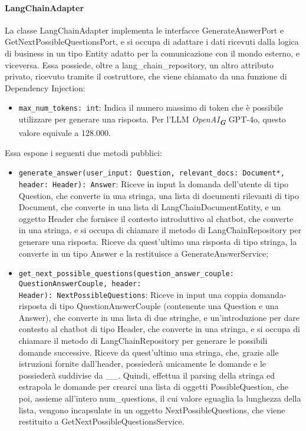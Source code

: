 \paragraph{LangChainAdapter}
\label{sec:langchain_adapter}
La classe LangChainAdapter implementa le interfacce GenerateAnswerPort e GetNextPossibleQuestionsPort, e si occupa di adattare i dati ricevuti dalla logica di business in un tipo Entity adatto per la comunicazione con il mondo esterno, e viceversa. 
Essa possiede, oltre a lang\_chain\_repository, un altro attributo privato, ricevuto tramite il costruttore, che viene chiamato da una funzione di Dependency Injection:
\begin{itemize}
    \item \texttt{max\_num\_tokens: int}: Indica il numero massimo di token che è possibile utilizzare per generare una risposta. Per l'LLM \emph{OpenAI}\textsubscript{\textbf{\textit{G}}} GPT-4o, questo valore equivale a 128.000.
\end{itemize}
Essa espone i seguenti due metodi pubblici:
\begin{itemize}
    \item \texttt{generate\_answer(user\_input: Question, relevant\_docs: Document*, header: Header): Answer}: Riceve in input la domanda dell'utente di tipo Question, che converte in una stringa, una lista di documenti rilevanti di tipo Document, che converte in una lista di LangChainDocumentEntity, e un oggetto Header che fornisce il contesto introduttivo al chatbot, che converte in una stringa, e si occupa di chiamare il metodo di LangChainRepository per generare una risposta. Riceve da quest'ultimo una risposta di tipo stringa, la converte in un tipo Answer e la restituisce a GenerateAnswerService;
    \item \texttt{get\_next\_possible\_questions(question\_answer\_couple: QuestionAnswerCouple, header:\\ Header): NextPossibleQuestions}: Riceve in input una coppia domanda-risposta di tipo QuestionAnswerCouple (contenente una Question e una Answer), che converte in una lista di due stringhe, e un'introduzione per dare contesto al chatbot di tipo Header, che converte in una stringa, e si occupa di chiamare il metodo di LangChainRepository per generare le possibili domande successive. Riceve da quest'ultimo una stringa, che, grazie alle istruzioni fornite dall'header, possiederà unicamente le domande e le possiederà suddivise da \_\_. Quindi, effettua il parsing della stringa ed estrapola le domande per crearci una lista di oggetti PossibleQuestion, che poi, assieme all'intero num\_questions, il cui valore eguaglia la lunghezza della lista, vengono incapsulate in un oggetto NextPossibleQuestions, che viene restituito a GetNextPossibleQuestionsService.
\end{itemize}

